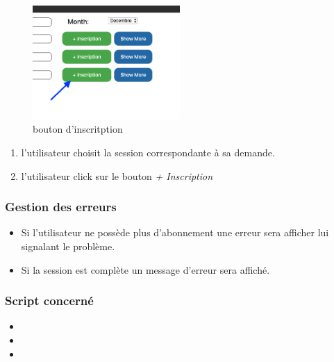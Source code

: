 \begin{figure}[!h]
	\includegraphics[width=0.5\textwidth,center]{Figures/us3-1}
	\caption{bouton d'inscritption}
\end{figure}

\begin{enumerate}
	\item l'utilisateur choisit la session correspondante à sa demande.
	\item l'utilisateur click sur le bouton  \textit{+ Inscription}
\end{enumerate}

\subsubsection{Gestion des erreurs}
	\begin{itemize}
		\item Si l'utilisateur ne possède plus d'abonnement une erreur sera afficher lui signalant le problème. 
		\item Si la session est complète un message d'erreur sera affiché. 
	\end{itemize}
	
\newpage
\subsubsection{Script concerné}
	\begin{itemize}
		\item {}
		\item {}
		\item {}
	\end{itemize}